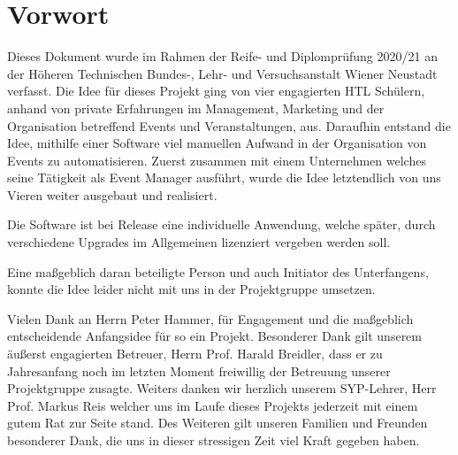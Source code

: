 \chapter{Vorwort}
Dieses Dokument wurde im Rahmen der Reife- und Diplomprüfung 2020/21 an der Höheren Technischen Bundes-, Lehr- und Versuchsanstalt Wiener Neustadt verfasst. Die Idee für dieses Projekt ging von vier engagierten HTL Schülern, anhand von
private Erfahrungen im Management, Marketing und der Organisation betreffend Events und Veranstaltungen, aus. Daraufhin entstand die Idee, mithilfe einer Software viel manuellen Aufwand in der Organisation von Events zu automatisieren. Zuerst zusammen mit einem Unternehmen
welches seine Tätigkeit als Event Manager ausführt, wurde die Idee letztendlich von uns Vieren weiter ausgebaut und realisiert.

Die Software ist bei Release eine individuelle Anwendung, welche später, durch verschiedene Upgrades im Allgemeinen lizenziert vergeben werden soll.

Eine maßgeblich daran beteiligte Person und auch Initiator des Unterfangens, konnte die Idee leider nicht mit uns in der Projektgruppe umsetzen.

Vielen Dank an Herrn Peter Hammer, für Engagement und die maßgeblich entscheidende Anfangsidee für so ein Projekt.
Besonderer Dank gilt unserem äußerst engagierten Betreuer, Herrn Prof. Harald Breidler, dass er zu Jahresanfang noch im letzten Moment freiwillig der Betreuung unserer Projektgruppe zusagte.
Weiters danken wir herzlich unserem SYP-Lehrer, Herr Prof. Markus Reis
welcher uns im Laufe dieses Projekts jederzeit mit einem gutem Rat zur Seite stand. 
Des Weiteren gilt unseren Familien und Freunden besonderer Dank, die uns in dieser stressigen Zeit viel Kraft gegeben haben.